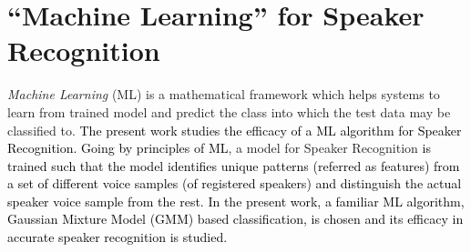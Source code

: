 \documentclass{article}
\begin{document}
\section{\textbf{{``Machine Learning'' for Speaker Recognition}}}
 \textit{Machine Learning} (ML) is a mathematical framework which helps systems to learn from trained model and predict the class into which the test data may be classified to. 
 \textcolor{black}{The present work studies the efficacy of a ML algorithm for Speaker Recognition. Going by principles of ML}, a model for Speaker Recognition \textcolor{black}{is trained such that the model identifies unique patterns (referred as features) from a set of different voice samples (of registered speakers) and distinguish the actual speaker voice sample from the rest. In the present work, a familiar ML algorithm, Gaussian Mixture Model (GMM) based classification, is chosen and its efficacy in accurate speaker recognition is studied.}
\end{document}
